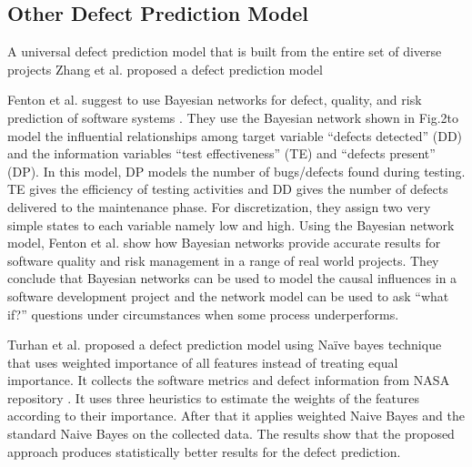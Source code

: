 \documentclass[12pt]{report}
\begin{document}


\subsection{Other Defect Prediction Model }

A universal defect prediction model that is built from the entire set of diverse projects Zhang et al. proposed a defect prediction model 

Fenton et al. suggest to use Bayesian networks for defect, quality, and risk prediction of software systems \cite{fenton2002software}. They use the Bayesian network shown in Fig.2to model the influential relationships among target variable “defects detected” (DD) and the information variables “test effectiveness” (TE) and “defects present” (DP). In this model, DP models the number of bugs/defects found during testing. TE gives the efficiency of testing activities and DD gives the number of defects delivered to the maintenance phase. For discretization, they assign two very simple states to each variable namely low and high. Using the Bayesian network model, Fenton et al. show how Bayesian networks provide accurate results for software quality and risk management in a range of real world projects. They conclude that Bayesian networks can be used to model the causal influences in a software development project and the network model can be used to ask “what if?” questions under circumstances when
some process underperforms.

Turhan et al. proposed a defect prediction model using Naïve bayes technique that uses weighted importance of all features instead of treating equal importance\cite{turhan2007software}. It collects the software metrics and defect information from NASA repository \cite{nasa2007respository}. It uses three heuristics to estimate the weights of the features according to their importance. After that it applies weighted Naive Bayes and the standard Naive Bayes on the collected data. The results show that the proposed approach produces statistically better results for the defect prediction.  
\end{document}
